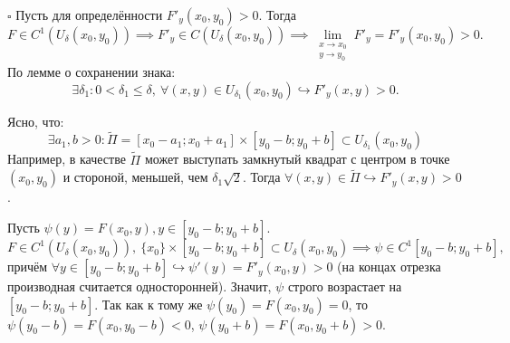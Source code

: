 \documentclass[12pt, a4paper, reqno]{article}
\begin{document}
    $\square$
    Пусть для определённости $F'_y(x_0, y_0) > 0$. Тогда
    \begin{equation*}
        F \in C^1(U_{\delta}(x_0, y_0)) \implies F'_y \in C(U_{\delta}(x_0, y_0)) \implies
        \lim\limits_{\substack{x \to x_0 \\ y \to y_0}} F'_y = F'_y(x_0, y_0) > 0.
    \end{equation*}
    По лемме о сохранении знака:
    \begin{equation*}
        \exists \delta_1: 0 < \delta_1 \leq \delta,\ \forall (x, y) \in U_{\delta_1}(x_0, y_0)
        \hookrightarrow F'_y(x, y) > 0.
    \end{equation*}

    Ясно, что:
    \begin{equation*}
        \exists a_1, b > 0: \tilde{\Pi} = [x_0 - a_1; x_0 + a_1] \times [y_0 - b; y_0 + b] \subset
        U_{\delta_1}(x_0, y_0)
    \end{equation*}
    Например, в качестве $\tilde{\Pi}$ может выступать замкнутый квадрат с центром в точке $(x_0, y_0)$
    и стороной, меньшей, чем $\delta_1 \sqrt{2}$. Тогда $\forall(x, y) \in \tilde{\Pi} \hookrightarrow
    F'_y(x, y) > 0$.

    Пусть $\psi(y) = F(x_0, y), y \in [y_0 - b; y_0 + b]$.
    \begin{equation*}
        F \in C^1(U_{\delta}(x_0, y_0)),\ \{x_0\} \times [y_0 - b; y_0 + b] \subset U_{\delta}(x_0, y_0)
        \implies \psi \in C^1[y_0 - b; y_0 + b],
    \end{equation*}
    причём $\forall y \in [y_0 - b; y_0 + b] \hookrightarrow \psi'(y) = F'_y(x_0, y) > 0$ (на концах
    отрезка производная считается односторонней). Значит, $\psi$ строго возрастает на $[y_0 - b; y_0 + b]$.
    Так как к тому же $\psi(y_0) = F(x_0, y_0) = 0$, то $\psi(y_0 - b) = F(x_0, y_0 - b) < 0$,
    $\psi(y_0 + b) = F(x_0, y_0 + b) > 0$.
\end{document}
